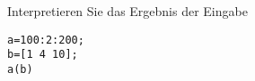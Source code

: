 \begin{aufg}[0]
 Interpretieren Sie das Ergebnis der Eingabe 
\begin{lstlisting}
a=100:2:200;
b=[1 4 10];
a(b)
\end{lstlisting}
\end{aufg}